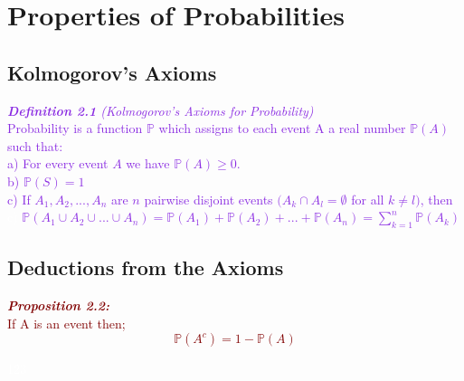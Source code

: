 \documentclass{report}
\newenvironment{cframed}[1][BlueViolet]
  {\begin{tcolorbox}[colframe=#1,colback=white]}
  {\end{tcolorbox}}
\newenvironment{cframedprop}[1][Maroon]
  {\begin{tcolorbox}[colframe=#1,colback=white]}
  {\end{tcolorbox}}
\begin{document}
\chapter{Properties of Probabilities}
\section{Kolmogorov's Axioms}

\begin{cframed}
\textcolor{BlueViolet}{\textit{\textbf{Definition 2.1} (Kolmogorov's Axioms for Probability)}}\\
\textcolor{BlueViolet}{Probability is a function $\mathbb{P}$ which assigns to each event A a real number $\mathbb{P}(A)$ such that:}\\
\textcolor{BlueViolet}{a) For every event $A$ we have $\mathbb{P}(A) \ge 0$.}\\
\textcolor{BlueViolet}{b) $\mathbb{P}(S) = 1$}\\
\textcolor{BlueViolet}{c) If $A_1,A_2,...,A_n$ are $n$ pairwise disjoint events $(A_k \cap A_l = \emptyset$ for all $k \neq l)$, then}\\
\textcolor{white}{c) }\textcolor{BlueViolet}{$\mathbb{P}(A_1 \cup A_2 \cup ... \cup A_n) = \mathbb{P}(A_1) + \mathbb{P}(A_2) + ... + \mathbb{P}(A_n) = \sum_{k=1}^{n} \mathbb{P}(A_k)$}\\
\end{cframed}

\section{Deductions from the Axioms}

\begin{cframedprop}

\textcolor{Maroon}{\textit{\textbf{Proposition 2.2:}}}\\
\textcolor{Maroon}{If A is an event then;
\begin{equation}
    \mathbb{P}(A^c) = 1 - \mathbb{P}(A)
\end{equation}}
\end{cframedprop}

\textcolor{White}{123}
\end{document}
